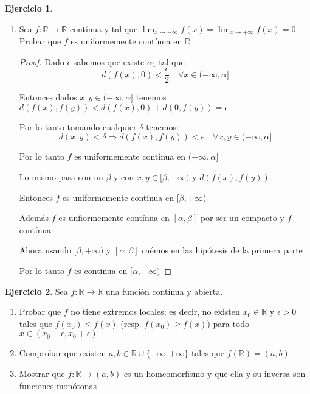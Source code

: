 \documentclass[11pt]{report}
\newcommand{\R}{\mathbb{R}}
\newcommand{\Ra}{\Rightarrow}
\newcommand{\ra}{\rightarrow}
\theoremstyle{definition}
\newtheorem{ej}{Ejercicio}
\begin{document}
\begin{ej}
\begin{enumerate}
				\begin{proof}
					Dado $\epsilon$ tomamos $\delta = \epsilon^2$

					$$ |\sqrt{x} - \sqrt{y}|^2 < |\sqrt{x} -\sqrt{y}|.|\sqrt{x} + \sqrt{y}| =  |\sqrt{x}^2 - \sqrt{y}^2| = |x -  y| < \delta = \epsilon^2$$

					Como la raíz cuadrada es una función estrictamente creciente 

					$$|\sqrt{x} - \sqrt{y}| < \epsilon^2 \iff |\sqrt{x} - \sqrt{y}| < \epsilon$$

					Entonces:

					$$ |x+y | < \delta \Ra |\sqrt{x} + \sqrt{y}| < \epsilon$$
				\end{proof}

			\item Sea $f : \R \ra \R$ contínua y tal que $\lim_{x \ra - \infty} f(x) = \lim_{x \ra + \infty} f(x) = 0$. Probar que $f$ es uniformemente contínua en $\R$
				\begin{proof}
					Dado $\epsilon$ sabemos que existe $\alpha_1$ tal que $$d(f(x),0) < \frac{\epsilon}{2} \quad \forall x \in (-\infty,\alpha] $$

					Entonces dados $x,y \in (-\infty,\alpha] $ tenemos $d(f(x),f(y)) < d(f(x),0) + d(0,f(y)) = \epsilon$

					Por lo tanto tomando cualquier $\delta$ tenemos: 
					$$d(x,y) < \delta \Ra d(f(x),f(y)) < \epsilon \quad \forall x,y \in (-\infty,\alpha] $$

					Por lo tanto $f$ es uniformemente contínua en $(-\infty,\alpha]$

					Lo mismo pasa con un $\beta$ y con $x,y \in [\beta,+\infty)$ y $d(f(x),f(y))$

					Entonces $f$ es uniformemente contínua en $[\beta,+\infty)$

					Además $f$ es unfiormemente contínua en $[\alpha,\beta]$ por ser un compacto y $f$ contínua 

					Ahora usando $[\beta,+\infty)$ y $[\alpha,\beta]$ caémos en las hipótesis de la primera parte

					Por lo tanto $f$ es contínua en $[\alpha,+\infty)$
				\end{proof}
				
				
		\end{enumerate}
	\end{ej}
	
	\begin{ej}
		Sea $f : \R \ra \R$ una función contínua y abierta.
		\begin{enumerate}
			\item Probar que $f$ no tiene extremos locales; es decir, no existen $x_0 \in \R$ y $\epsilon > 0$ tales que $f(x_0) \leq f(x)$ (resp. $f(x_0) \geq f(x)$) para todo $x \in (x_0 - \epsilon,x_0 + \epsilon)$

			\item Comprobar que existen $a,b \in \R \cup \{-\infty,+\infty\}$ tales que $f(\R) = (a,b)$
			\item Mostrar que $f: \R \ra (a,b)$ es un homeomorfismo y que ella y su inversa son funciones monótonas
		\end{enumerate}
	\end{ej}
	
	
	
		
\end{document}
